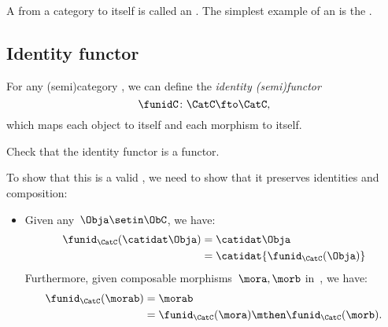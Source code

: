 
A  from a category to itself is called an .
The simplest example of an  is the .

\subsection{Identity functor}
\label{sec:identity-functor}

\begin{definition}\label{def:identity-semifunctor}
    For any (semi)category \CatC, we can define the \emph{identity (semi)functor}
    \begin{equation}
        \funidC \colon \CatC \fto \CatC,
    \end{equation}
    which maps each object to itself and each morphism to itself.
\end{definition}

\begin{exercise}
    Check that the identity functor is a functor.
\end{exercise}
\begin{solution}
    To show that this is a valid , we need to show that it preserves identities and composition:
    \begin{itemize}
        \item Given any~$\Obja \setin \ObC$, we have:
              \begin{equation}
                  \begin{aligned}
                      \funid_{\CatC}(\catidat\Obja) & =\catidat\Obja \\
                                                    & =\catidat{\funid_{\CatC}(\Obja)}
                  \end{aligned}
              \end{equation}
              Furthermore, given composable morphisms~$\mora,\morb$ in~\CatC, we have:
              \begin{equation}
                  \begin{aligned}
                      \funid_{\CatC}(\morab) & =\morab \\
                                             & =\funid_{\CatC}(\mora)\mthen \funid_{\CatC} (\morb).
                  \end{aligned}
              \end{equation}
    \end{itemize}
\end{solution}


